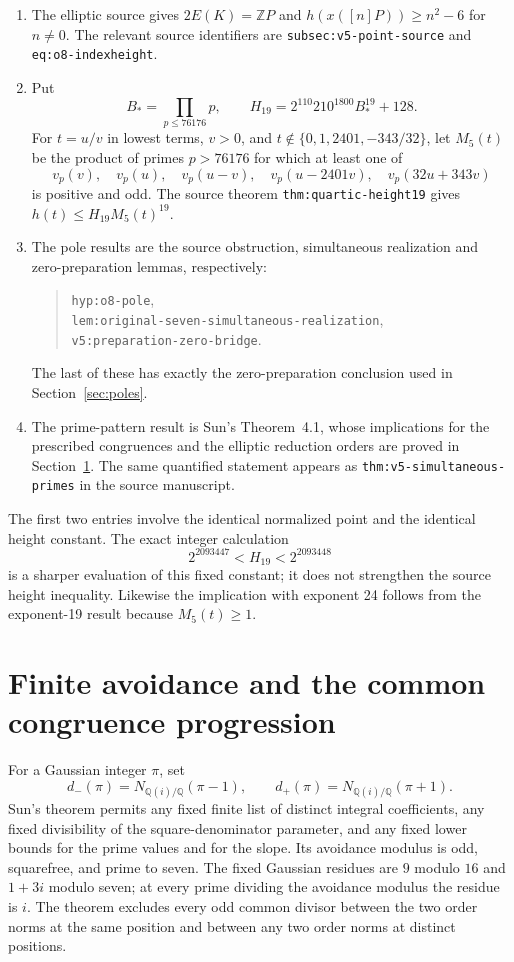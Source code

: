\documentclass[11pt,a4paper]{article}
\theoremstyle{remark}\newtheorem{remark}[theorem]{Remark}
\newcommand{\Q}{\mathbb Q}\newcommand{\Z}{\mathbb Z}
\begin{document}
\begin{enumerate}
\item The elliptic source gives $2E(K)=\Z P$ and
      $h(x([n]P))\ge n^2-6$ for $n\ne0$.
      The relevant source identifiers are
      \nolinkurl{subsec:v5-point-source} and
      \nolinkurl{eq:o8-indexheight}.
\item Put
\[
 B_* = \prod_{p\le76176}p,
 \qquad H_{19}=2^{110}210^{1800}B_*^{19}+128.
\]
      For $t=u/v$ in lowest terms, $v>0$, and
      $t\notin\{0,1,2401,-343/32\}$, let $M_5(t)$ be the product
      of primes $p>76176$ for which at least one of
\[
 v_p(v),\quad v_p(u),\quad v_p(u-v),\quad
 v_p(u-2401v),\quad v_p(32u+343v)
\]
      is positive and odd. The source theorem
      \nolinkurl{thm:quartic-height19} gives
      $h(t)\le H_{19}M_5(t)^{19}$.
\item The pole results are the source obstruction, simultaneous
      realization and zero-preparation lemmas, respectively:
      \begin{quote}\small
      \nolinkurl{hyp:o8-pole},\\
      \nolinkurl{lem:original-seven-simultaneous-realization},\\
      \nolinkurl{v5:preparation-zero-bridge}.
      \end{quote}
      The last of these has exactly the zero-preparation conclusion
      used in Section~\ref{sec:poles}.
\item The prime-pattern result is Sun's Theorem~4.1, whose implications
      for the prescribed congruences and the elliptic reduction orders
      are proved in Section~\ref{sec:avoidance}. The same quantified
      statement appears as \nolinkurl{thm:v5-simultaneous-primes}
      in the source manuscript.
\end{enumerate}

The first two entries involve the identical normalized point and the
identical height constant. The exact integer calculation
\[
                      2^{2093447}<H_{19}<2^{2093448}
\]
is a sharper evaluation of this fixed constant; it does not strengthen
the source height inequality. Likewise the implication with exponent
24 follows from the exponent-19 result because $M_5(t)\ge1$.

\section{Finite avoidance and the common congruence progression}
\label{sec:avoidance}

For a Gaussian integer $\pi$, set
\[
 d_-(\pi)=N_{\Q(i)/\Q}(\pi-1),\qquad
 d_+(\pi)=N_{\Q(i)/\Q}(\pi+1).
\]
Sun's theorem permits any fixed finite list of distinct integral
coefficients, any fixed divisibility of the square-denominator parameter,
and any fixed lower bounds for the prime values and for the slope.
Its avoidance modulus is odd, squarefree, and prime to seven.
The fixed Gaussian residues are $9$ modulo $16$ and $1+3i$ modulo seven;
at every prime dividing the avoidance modulus the residue is $i$.
The theorem excludes every odd common divisor between the two order
norms at the same position and between any two order norms at distinct
positions.
\end{document}
